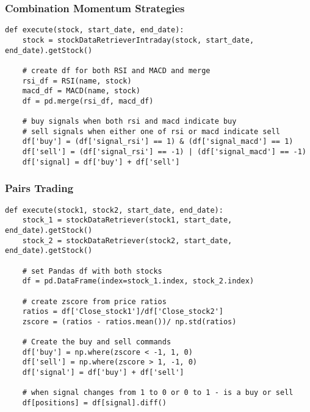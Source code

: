 \documentclass[../thesis.tex]{subfiles}
\begin{document}
\subsubsection{Combination Momentum Strategies }

\begin{verbatim}
def execute(stock, start_date, end_date):
    stock = stockDataRetrieverIntraday(stock, start_date, end_date).getStock()
	
    # create df for both RSI and MACD and merge
    rsi_df = RSI(name, stock)
    macd_df = MACD(name, stock)
    df = pd.merge(rsi_df, macd_df)
    
    # buy signals when both rsi and macd indicate buy
    # sell signals when either one of rsi or macd indicate sell
    df['buy'] = (df['signal_rsi'] == 1) & (df['signal_macd'] == 1)
    df['sell'] = (df['signal_rsi'] == -1) | (df['signal_macd'] == -1)
    df['signal] = df['buy'] + df['sell']

\end{verbatim}

\subsubsection{Pairs Trading}

\begin{verbatim}
def execute(stock1, stock2, start_date, end_date):
    stock_1 = stockDataRetriever(stock1, start_date, end_date).getStock()
    stock_2 = stockDataRetriever(stock2, start_date, end_date).getStock()

    # set Pandas df with both stocks
    df = pd.DataFrame(index=stock_1.index, stock_2.index)

    # create zscore from price ratios
    ratios = df['Close_stock1']/df['Close_stock2']
    zscore = (ratios - ratios.mean())/ np.std(ratios)

    # Create the buy and sell commands
    df['buy'] = np.where(zscore < -1, 1, 0)
    df['sell'] = np.where(zscore > 1, -1, 0)
    df['signal'] = df['buy'] + df['sell']

    # when signal changes from 1 to 0 or 0 to 1 - is a buy or sell
    df[positions] = df[signal].diff()

\end{verbatim}
\end{document}

